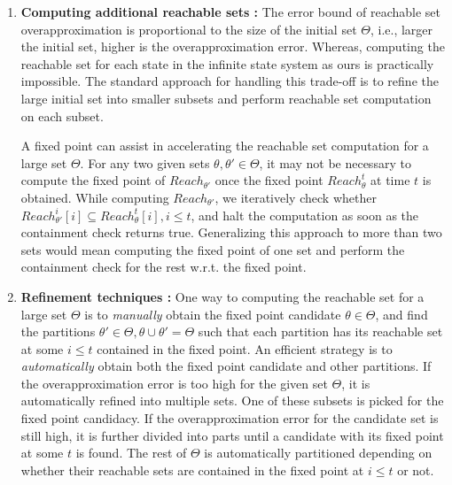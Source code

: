 \begin{enumerate}[wide, labelindent=0pt]
\item \textbf{Computing additional reachable sets :} The error bound of reachable set overapproximation is proportional to the size of the initial set $\Theta$, i.e., larger the initial set, higher is the overapproximation error. 
%
Whereas, computing the reachable set for each state in the infinite state system as ours is practically impossible. 
%
The standard approach for handling this trade-off is to refine the large initial set into smaller subsets and perform reachable set computation on each subset.

A fixed point can assist in accelerating the reachable set computation for a large set $\Theta$. For any two given sets $\theta, \theta' \in \Theta$, it may not be necessary to compute the fixed point of $Reach_{\theta'}$ once the fixed point  $Reach_{\theta}^t$ at time $t$ is obtained. 
%
While computing $Reach_{\theta'}$, we iteratively check whether $Reach_{\theta'}^i[i] \subseteq Reach_{\theta}^t[i], i \leq t$, and halt the computation as soon as the containment check returns true. 
%
Generalizing this approach to more than two sets would mean computing the fixed point of one set and perform the containment check for the rest w.r.t. the fixed point.

\item \textbf{Refinement techniques :} One way to computing the   reachable set for a large set $\Theta$ is to \emph{manually} obtain the fixed point candidate $\theta \in \Theta$, and find the partitions $\theta' \in \Theta, \theta \cup \theta' = \Theta$ such that each partition has its reachable set at some $i \leq t$  contained in the fixed point. 
%
An efficient strategy is to \emph{automatically} obtain both the fixed point candidate and other partitions. If the overapproximation error is too high for the given set $\Theta$, it is automatically refined into multiple sets. 
%
One of these subsets is picked for the fixed point candidacy. If the overapproximation error for the candidate  set is still high, it is further divided into parts until a candidate with its fixed point at some $t$ is found. The rest of $\Theta$ is automatically partitioned depending on whether their reachable sets are contained in the fixed point at $i \leq t$ or not.
\end{enumerate}


